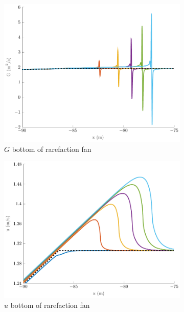 \documentclass[10pt]{elsarticle}
\begin{document}
\begin{figure}
\begin{subfigure}{0.32\textwidth}
	\includegraphics[width=\textwidth]{./Figures/Simulations/Study/RegSWWE/Convergence/GRFBot.pdf}
	\caption{$G$ bottom of rarefaction fan}
	\end{subfigure}
	\begin{subfigure}{0.32\textwidth}
	\centering
	\includegraphics[width=\textwidth]{./Figures/Simulations/Study/RegSWWE/Convergence/uRFBot.pdf}
	\caption{$u$ bottom  of rarefaction fan}
	\end{subfigure}
	\begin{subfigure}{0.32\textwidth}
	\centering

\end{subfigure}
\end{figure}
\end{document}
